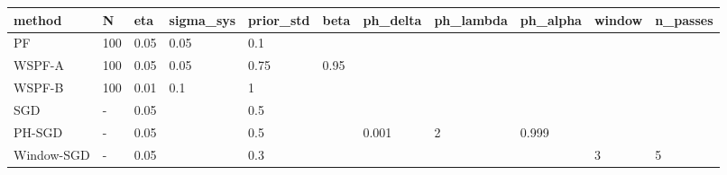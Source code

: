 \begin{tabular}{lllllllllll}
\hline
method & N & eta & sigma\_sys & prior\_std & beta & ph\_delta & ph\_lambda & ph\_alpha & window & n\_passes \\
\hline
PF & 100 & 0.05 & 0.05 & 0.1 &  &  &  &  &  &  \\
WSPF-A & 100 & 0.05 & 0.05 & 0.75 & 0.95 &  &  &  &  &  \\
WSPF-B & 100 & 0.01 & 0.1 & 1 &  &  &  &  &  &  \\
SGD & - & 0.05 &  & 0.5 &  &  &  &  &  &  \\
PH-SGD & - & 0.05 &  & 0.5 &  & 0.001 & 2 & 0.999 &  &  \\
Window-SGD & - & 0.05 &  & 0.3 &  &  &  &  & 3 & 5 \\
\hline
\end{tabular}
